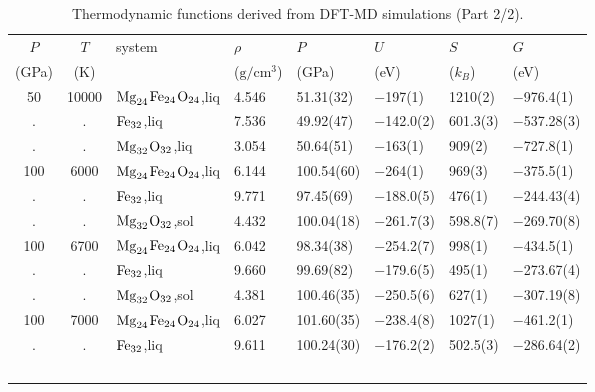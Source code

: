 \begin{table}[hp]
\centering

\caption{Thermodynamic functions derived from DFT-MD simulations (Part 2/2).}
\begin{adjustbox}{max width=\textwidth}
\begin{tabular}{ccllllll}
    \hline
 {$P$} & {$T$} & {system} &  {$\rho$} & 
 {$P$} & {$U$} & {$S$} &  {$G$}  \\
 {(GPa)} & {(K)} & &  {($\mathrm{g}/\mathrm{cm}^3$)} 
   & {(GPa)} & {(eV)} & {($k_B$)} & {(eV)} \\
   \hline
            50 &  10000 &  $\rm{Mg}_{24}$$\rm{Fe}_{24}$$\rm{O}_{24}$,liq &   4.546 &   51.31(32) &     $-$197(1) &    1210(2) &     $-$976.4(1) \\
             . &      . &                             $\rm{Fe}_{32}$,liq &   7.536 &   49.92(47) &   $-$142.0(2) &   601.3(3) &    $-$537.28(3) \\
             . &      . &                $\rm{Mg}_{32}$$\rm{O}_{32}$,liq &   3.054 &   50.64(51) &     $-$163(1) &     909(2) &     $-$727.8(1) \\
           100 &   6000 &  $\rm{Mg}_{24}$$\rm{Fe}_{24}$$\rm{O}_{24}$,liq &   6.144 &  100.54(60) &     $-$264(1) &     969(3) &     $-$375.5(1) \\
             . &      . &                             $\rm{Fe}_{32}$,liq &   9.771 &   97.45(69) &   $-$188.0(5) &     476(1) &    $-$244.43(4) \\
             . &      . &                $\rm{Mg}_{32}$$\rm{O}_{32}$,sol &   4.432 &  100.04(18) &   $-$261.7(3) &   598.8(7) &    $-$269.70(8) \\
           100 &   6700 &  $\rm{Mg}_{24}$$\rm{Fe}_{24}$$\rm{O}_{24}$,liq &   6.042 &   98.34(38) &   $-$254.2(7) &     998(1) &     $-$434.5(1) \\
             . &      . &                             $\rm{Fe}_{32}$,liq &   9.660 &   99.69(82) &   $-$179.6(5) &     495(1) &    $-$273.67(4) \\
             . &      . &                $\rm{Mg}_{32}$$\rm{O}_{32}$,sol &   4.381 &  100.46(35) &   $-$250.5(6) &     627(1) &    $-$307.19(8) \\
           100 &   7000 &  $\rm{Mg}_{24}$$\rm{Fe}_{24}$$\rm{O}_{24}$,liq &   6.027 &  101.60(35) &   $-$238.4(8) &    1027(1) &     $-$461.2(1) \\
             . &      . &                             $\rm{Fe}_{32}$,liq &   9.611 &  100.24(30) &   $-$176.2(2) &   502.5(3) &    $-$286.64(2) \\
$$
\end{tabular}
\end{adjustbox}
\end{table}
